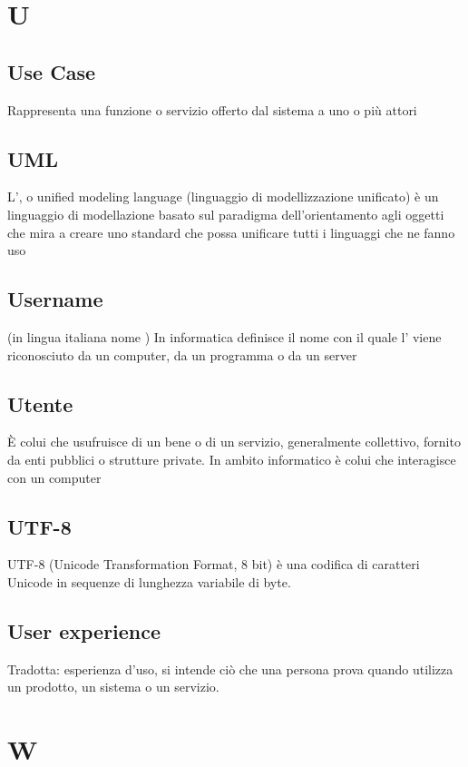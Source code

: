 {{%
\section{U}
		\subsection{Use Case}
		Rappresenta una funzione o servizio offerto dal sistema a uno o più attori


		\subsection{UML}
		L', o unified modeling language (linguaggio di modellizzazione unificato) è un linguaggio di modellazione basato sul paradigma dell'orientamento agli oggetti
		che mira a creare uno standard che possa unificare tutti i linguaggi che ne fanno uso


		\subsection{Username}
		(in lingua italiana nome ) In informatica definisce il nome con il quale l' viene riconosciuto da un computer, da un programma o da un server


		\subsection{Utente}
		È colui che usufruisce di un bene o di un servizio, generalmente collettivo, fornito da enti pubblici o strutture private.
In ambito informatico è colui che interagisce con un computer


		\subsection{UTF-8}
		UTF-8 (Unicode Transformation Format, 8 bit) è una codifica di caratteri Unicode in sequenze di lunghezza variabile di byte.


		\subsection{User experience}
		Tradotta: esperienza d'uso, si intende ciò che una persona prova quando utilizza un prodotto, un sistema o un servizio.


\section{W}
}}
